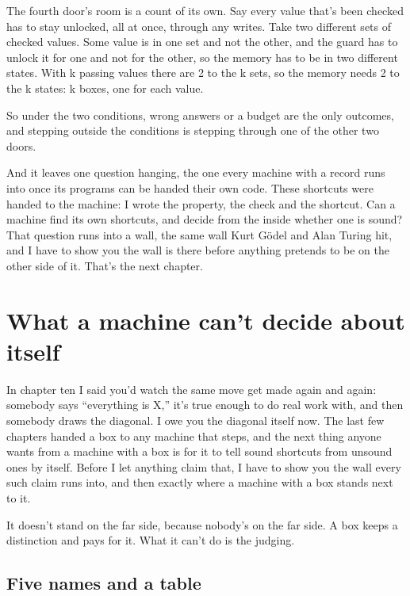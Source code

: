 \documentclass[11pt,twoside]{article}
\theoremstyle{thielethm}
\theoremstyle{thieledef}
\theoremstyle{thieledef}
\theoremstyle{thieledef}
\theoremstyle{thielethm}
\theoremstyle{thieleobs}
\theoremstyle{thielethm}
\begin{document}
The fourth door's room is a count of its own. Say every value that's been checked has to stay unlocked, all at once, through any writes. Take two different sets of checked values. Some value is in one set and not the other, and the guard has to unlock it for one and not for the other, so the memory has to be in two different states. With k passing values there are 2 to the k sets, so the memory needs 2 to the k states: k boxes, one for each value.

So under the two conditions, wrong answers or a budget are the only outcomes, and stepping outside the conditions is stepping through one of the other two doors.

And it leaves one question hanging, the one every machine with a record runs into once its programs can be handed their own code. These shortcuts were handed to the machine: I wrote the property, the check and the shortcut. Can a machine find its own shortcuts, and decide from the inside whether one is sound? That question runs into a wall, the same wall Kurt Gödel and Alan Turing hit, and I have to show you the wall is there before anything pretends to be on the other side of it. That's the next chapter.

\section{What a machine can't decide about itself}
\label{sec:diagonal}

In chapter ten I said you'd watch the same move get made again and again: somebody says ``everything is X,'' it's true enough to do real work with, and then somebody draws the diagonal. I owe you the diagonal itself now. The last few chapters handed a box to any machine that steps, and the next thing anyone wants from a machine with a box is for it to tell sound shortcuts from unsound ones by itself. Before I let anything claim that, I have to show you the wall every such claim runs into, and then exactly where a machine with a box stands next to it.

It doesn't stand on the far side, because nobody's on the far side. A box keeps a distinction and pays for it. What it can't do is the judging.

\subsection{Five names and a table}
\end{document}
